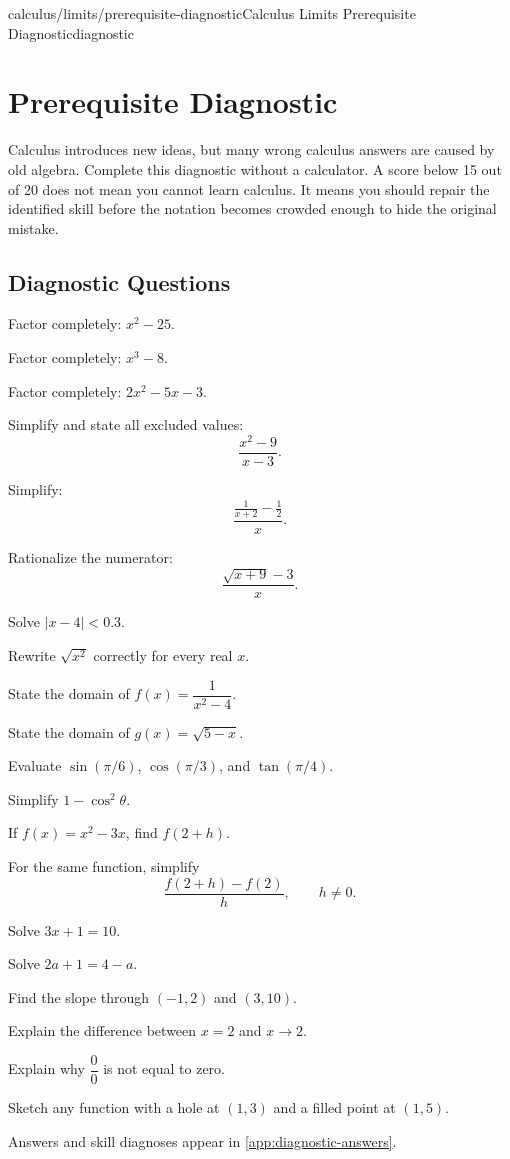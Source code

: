\begin{webpage}{calculus/limits/prerequisite-diagnostic}{Calculus Limits Prerequisite Diagnostic}{diagnostic}
\chapter*{Prerequisite Diagnostic}

Calculus introduces new ideas, but many wrong calculus answers are caused by old algebra. Complete this diagnostic without a calculator. A score below 15 out of 20 does not mean you cannot learn calculus. It means you should repair the identified skill before the notation becomes crowded enough to hide the original mistake.

\section*{Diagnostic Questions}

\begin{bgexercises}
  \item Factor completely: \(x^2-25\).
  \item Factor completely: \(x^3-8\).
  \item Factor completely: \(2x^2-5x-3\).
  \item Simplify and state all excluded values:
  \[
    \frac{x^2-9}{x-3}.
  \]
  \item Simplify:
  \[
    \frac{\frac{1}{x+2}-\frac12}{x}.
  \]
  \item Rationalize the numerator:
  \[
    \frac{\sqrt{x+9}-3}{x}.
  \]
  \item Solve \(|x-4|<0.3\).
  \item Rewrite \(\sqrt{x^2}\) correctly for every real \(x\).
  \item State the domain of \(f(x)=\dfrac{1}{x^2-4}\).
  \item State the domain of \(g(x)=\sqrt{5-x}\).
  \item Evaluate \(\sin(\pi/6)\), \(\cos(\pi/3)\), and \(\tan(\pi/4)\).
  \item Simplify \(1-\cos^2\theta\).
  \item If \(f(x)=x^2-3x\), find \(f(2+h)\).
  \item For the same function, simplify
  \[
    \frac{f(2+h)-f(2)}{h},\qquad h\ne0.
  \]
  \item Solve \(3x+1=10\).
  \item Solve \(2a+1=4-a\).
  \item Find the slope through \((-1,2)\) and \((3,10)\).
  \item Explain the difference between \(x=2\) and \(x\to2\).
  \item Explain why \(\dfrac00\) is not equal to zero.
  \item Sketch any function with a hole at \((1,3)\) and a filled point at \((1,5)\).
\end{bgexercises}

Answers and skill diagnoses appear in \cref{app:diagnostic-answers}.
\end{webpage}

